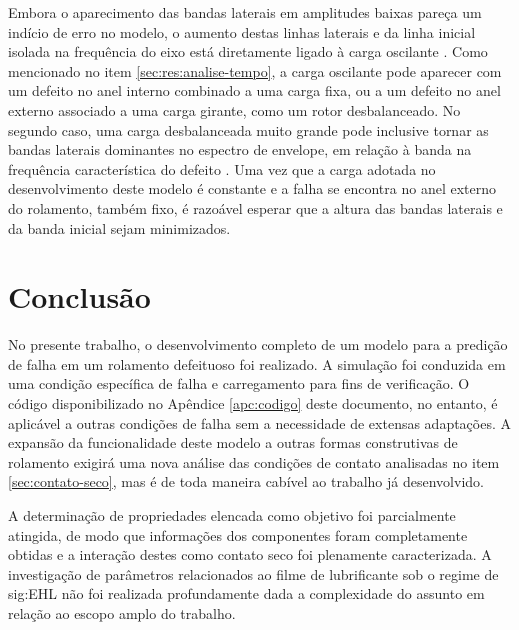\documentclass[12pt,oneside,english,brazil,lmodern,siglas,simbolos,cite=num]{ucsmonograph}
\begin{document}
	Embora o aparecimento das bandas laterais em amplitudes baixas pareça um indício de erro no modelo, o aumento destas linhas laterais e da linha inicial isolada na frequência do eixo está diretamente ligado à carga oscilante \cite{cong:2013}.
	Como mencionado no item \ref{sec:res:analise-tempo}, a carga oscilante pode aparecer com um defeito no anel interno combinado a uma carga fixa, ou a um defeito no anel externo associado a uma carga girante, como um rotor desbalanceado.
	No segundo caso, uma carga desbalanceada muito grande pode inclusive tornar as bandas laterais dominantes no espectro de envelope, em relação à banda na frequência característica do defeito \cite{cong:2013}.
	Uma vez que a carga adotada no desenvolvimento deste modelo é constante e a falha se encontra no anel externo do rolamento, também fixo, é razoável esperar que a altura das bandas laterais e da banda inicial sejam minimizados.
	
	\begin{figure}[H]
		\label{fig:modelo-ext-envspec-sidebands}
	\end{figure}
	
	\chapter{Conclusão} \label{sec:conclusao}
	No presente trabalho, o desenvolvimento completo de um modelo para a predição de falha em um rolamento defeituoso foi realizado.
	A simulação foi conduzida em uma condição específica de falha e carregamento para fins de verificação.
	O código disponibilizado no Apêndice \ref{apc:codigo} deste documento, no entanto, é aplicável a outras condições de falha sem a necessidade de extensas adaptações.
	A expansão da funcionalidade deste modelo a outras formas construtivas de rolamento exigirá uma nova análise das condições de contato analisadas no item \ref{sec:contato-seco}, mas é de toda maneira cabível ao trabalho já desenvolvido.
	
	A determinação de propriedades elencada como objetivo foi parcialmente atingida, de modo que informações dos componentes foram completamente obtidas e a interação destes como contato seco foi plenamente caracterizada.
	A investigação de parâmetros relacionados ao filme de lubrificante sob o regime de \gls{sig:EHL} não foi realizada profundamente dada a complexidade do assunto em relação ao escopo amplo do trabalho.
	
\end{document}
